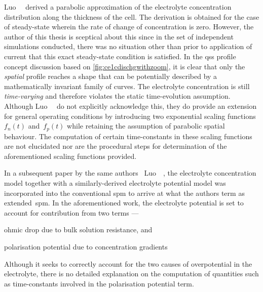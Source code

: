 Luo~\etal~\cite{Luo2013} derived  a parabolic  approximation of  the electrolyte
concentration  distribution along  the  thickness of  the  cell. The  derivation
is  obtained  for  the case  of  steady-state  wherein  the  rate of  change  of
concentration  is  zero.  However,  the  author  of  this  thesis  is  sceptical
about  this  since  in  the  set of  independent  simulations  conducted,  there
was  no  situation  other  than  prior  to  application  of  current  that  this
exact  steady-state condition  is satisfied.  In the  \gls{qss} profile  concept
discussion based  on \cref{fig:ce1cdischgwithzoom},  it is  clear that  only the
\emph{spatial} profile  reaches a shape that  can be potentially described  by a
mathematically  invariant family  of  curves. The  electrolyte concentration  is
still  \emph{time-varying}  and  therefore violates  the  static  time-evolution
assumption.  Although  Luo~\etal~\cite{Luo2013}  do not  explicitly  acknowledge
this,  they  do  provide  an  extension  for  general  operating  conditions  by
introducing  two  exponential   scaling  functions~$f_n(t)$  and~$f_p(t)$  while
retaining  the assumption  of parabolic  spatial behaviour.  The computation  of
certain time-constants in these scaling functions are not elucidated nor are the
procedural  steps  for determination  of  the  aforementioned scaling  functions
provided.


In a  subsequent paper  by the  same authors  \ie~Luo~\etal~\cite{Luo2013a}, the
electrolyte concentration  model together  with a  similarly-derived electrolyte
potential model  was incorporated into  the conventional \gls{spm} to  arrive at
what the  authors term  as extended~\gls{spm}. In  the aforementioned  work, the
electrolyte potential is set to account for contribution from two terms ---
\begin{enumerate*}[label=\emph{\alph*})]
    \item ohmic drop due to bulk solution resistance, and
    \item polarisation potential due to concentration gradients
\end{enumerate*}
Although it  seeks to correctly account  for the two causes  of overpotential in
the  electrolyte,  there  is  no  detailed explanation  on  the  computation  of
quantities such as time-constants involved in the polarisation potential term.

